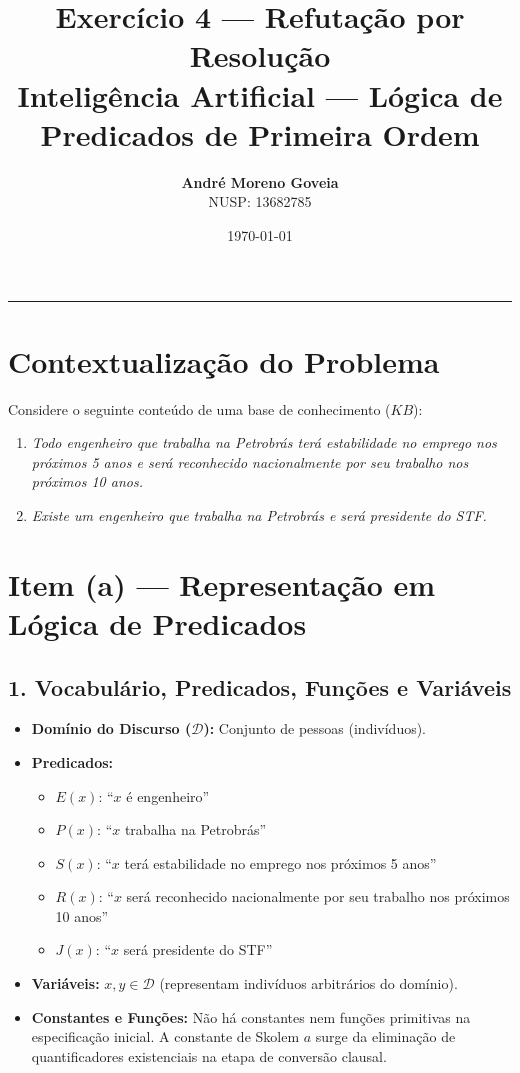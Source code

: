 \documentclass[11pt,a4paper]{article}
\title{\vspace{-1cm}\textbf{Exercício 4 --- Refutação por Resolução}\\
\large Inteligência Artificial --- Lógica de Predicados de Primeira Ordem}
\author{\textbf{André Moreno Goveia} \\ NUSP: 13682785}
\date{\today}
\begin{document}
\maketitle

\vspace{-0.4cm}
\hrule
\vspace{0.4cm}

\section*{Contextualização do Problema}

Considere o seguinte conteúdo de uma base de conhecimento ($KB$):
\begin{enumerate}[label=\textbf{\arabic*.}]
    \item \textit{Todo engenheiro que trabalha na Petrobrás terá estabilidade no emprego nos próximos 5 anos e será reconhecido nacionalmente por seu trabalho nos próximos 10 anos.}
    \item \textit{Existe um engenheiro que trabalha na Petrobrás e será presidente do STF.}
\end{enumerate}

\section*{Item (a) --- Representação em Lógica de Predicados}

\subsection*{1. Vocabulário, Predicados, Funções e Variáveis}

\begin{itemize}
    \item \textbf{Domínio do Discurso ($\mathcal{D}$):} Conjunto de pessoas (indivíduos).
    \item \textbf{Predicados:}
    \begin{itemize}
        \item $E(x)$: ``$x$ é engenheiro''
        \item $P(x)$: ``$x$ trabalha na Petrobrás''
        \item $S(x)$: ``$x$ terá estabilidade no emprego nos próximos 5 anos''
        \item $R(x)$: ``$x$ será reconhecido nacionalmente por seu trabalho nos próximos 10 anos''
        \item $J(x)$: ``$x$ será presidente do STF''
    \end{itemize}
    \item \textbf{Variáveis:} $x, y \in \mathcal{D}$ (representam indivíduos arbitrários do domínio).
    \item \textbf{Constantes e Funções:} Não há constantes nem funções primitivas na especificação inicial. A constante de Skolem $a$ surge da eliminação de quantificadores existenciais na etapa de conversão clausal.
\end{itemize}
\end{document}
